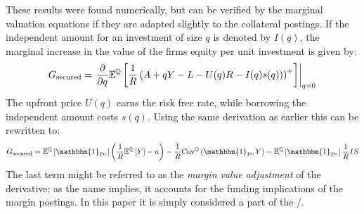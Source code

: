 \documentclass[main.tex]{subfiles}
\begin{document}
        These results were found numerically, 
        but can be verified by the marginal valuation equations
        if they are adapted slightly to the collateral postings.
        If the independent amount for an investment of size $q$ is denoted by $I(q)$,
        the marginal increase in the value of the firms equity per unit investment is given by:
            \begin{equation*}
                G_{\text{secured}} = 
                    \left.
                    \frac{
                        \partial 
                    }{
                        \partial 
                        q
                    }
                    \mathbb{E}^{\mathbb{Q}}\left[
                        \frac{1}{R} 
                        \left(
                            A + qY - L - U(q)R - I(q) s(q))
                        \right)^{+}
                    \right] 
                    \right\rvert_{q=0} 
                    \nonumber
            \end{equation*}
        The upfront price $U(q)$ earns the risk free rate,
        while borrowing the independent amount costs $s(q)$.
        Using the same derivation as earlier this can be rewritten to:
            \begin{equation}
                G_{\text{secured}} 
                =
                    \mathbb{E}^{\mathbb{Q}}\left[\mathbbm{1}_{\mathcal{D}^{c}}\right] 
                    \left(
                        \discountfactor
                        \mathbb{E}^{\mathbb{Q}}\left[Y\right] 
                        - u
                    \right)
                    -
                    \discountfactor
                    \text{Cov}^{\mathbb{Q}}\left(\mathbbm{1}_{\mathcal{D}}, Y\right) 
                    - 
                    \mathbb{E}^{\mathbb{Q}}\left[
                        \mathbbm{1}_{\mathcal{D}^{c}}
                    \right] \discountfactor I S
                \label{eqn:marginal-shareholder-value-debt-financing-collateral}
            \end{equation}
        The last term might be referred to as the \textit{margin value adjustment} of the derivative;
        as the name implies, it accounts for the funding implications of the margin postings.
        In this paper it is simply considered a part of the \FVA/.
\end{document}
